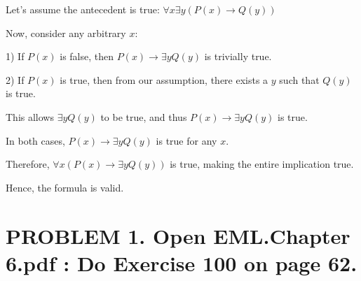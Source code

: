 \documentclass{article}
\begin{document}
\vspace{1em}
Let's assume the antecedent is true: $\forall x \exists y (P(x) \rightarrow Q(y))$

\vspace{1em}
Now, consider any arbitrary $x$:

\vspace{1em}
1) If $P(x)$ is false, then $P(x) \rightarrow \exists y Q(y)$ is trivially true.

\vspace{1em}
2) If $P(x)$ is true, then from our assumption, there exists a $y$ such that $Q(y)$ is true.

\vspace{1em}
This allows $\exists y Q(y)$ to be true, and thus $P(x) \rightarrow \exists y Q(y)$ is true.

\vspace{1em}
In both cases, $P(x) \rightarrow \exists y Q(y)$ is true for any $x$.

\vspace{1em}
Therefore, $\forall x (P(x) \rightarrow \exists y Q(y))$ is true, making the entire implication true.

\vspace{1em}
Hence, the formula is valid.

\newpage
\section*{PROBLEM 1. Open EML.Chapter 6.pdf : Do Exercise 100 on page 62.}
\end{document}
